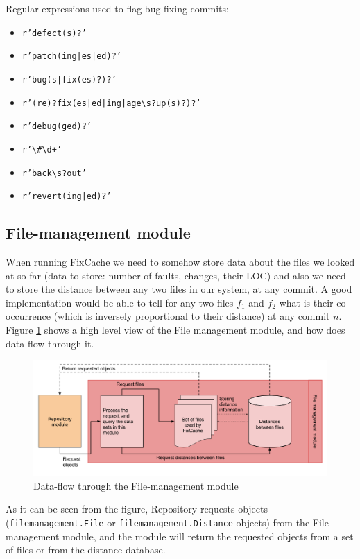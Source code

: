 \documentclass[12pt,twoside,notitlepage]{report}
\newcommand{\fxch}{FixCache}
\begin{document}
Regular expressions used to flag bug-fixing commits:
\begin{itemize}
\item \texttt{r'defect(s)?'}
\item \texttt{r'patch(ing|es|ed)?'}
\item \texttt{r'bug(s|fix(es)?)?'}
\item \texttt{r'(re)?fix(es|ed|ing|age\textbackslash s?up(s)?)?'}
\item \texttt{r'debug(ged)?'}
\item \texttt{r'\textbackslash\#\textbackslash d+'}
\item \texttt{r'back\textbackslash s?out'}
\item \texttt{r'revert(ing|ed)?'}
\end{itemize}
\subsection{File-management module}
When running \fxch{}{} we need to somehow store data about the files we looked at so far (data to store: number of faults, changes, their LOC) and also we need to store the distance between any two files in our system, at any commit. A  good implementation would be able to tell for any two files $f_1$ and $f_2$ what is their co-occurrence (which is inversely proportional to their distance) at any commit $n$. Figure \ref{filemanagement_module} shows a high level view of the File management module, and how does data flow through it.
\begin{figure}[h]
\includegraphics[width=1.0\textwidth]{filemanagement_module.png}
\caption{Data-flow through the File-management module}
\label{filemanagement_module}
\end{figure}

As it can be seen from the figure, Repository requests objects (\texttt{filemanagement.File} or \texttt{filemanagement.Distance} objects) from the File-management module, and the module will return the requested objects from a set of files or from the distance database.
\end{document}
